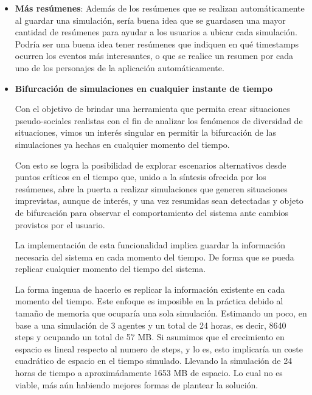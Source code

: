 \begin{itemize}
	\item \textbf{Más resúmenes}: Además de los resúmenes que se realizan automáticamente al guardar una simulación, sería buena idea que se guardasen una mayor cantidad de resúmenes para ayudar a los usuarios a ubicar cada simulación. Podría ser una buena idea tener resúmenes que indiquen en qué timestamps ocurren los eventos más interesantes, o que se realice un resumen por cada uno de los personajes de la aplicación automáticamente.

	\item\textbf{Bifurcación de simulaciones en cualquier instante de tiempo}

Con el objetivo de brindar una herramienta que permita crear situaciones pseudo-sociales realistas con el fin de analizar los fenómenos de diversidad de situaciones, vimos un interés singular en permitir la bifurcación de las simulaciones ya hechas en cualquier momento del tiempo.

Con esto se logra la posibilidad de explorar escenarios alternativos desde puntos críticos en el tiempo que, unido a la síntesis ofrecida por los resúmenes, abre la puerta a realizar simulaciones que generen situaciones imprevistas, aunque de interés, y una vez resumidas sean detectadas y objeto de bifurcación para observar el comportamiento del sistema ante cambios provistos por el usuario.

La implementación de esta funcionalidad implica guardar la información necesaria del sistema en cada momento del tiempo. De forma que se pueda replicar cualquier momento del tiempo del sistema. 

La forma ingenua de hacerlo es replicar la información existente en cada momento del tiempo. Este enfoque es imposible en la práctica debido al tamaño de memoria que ocuparía una sola simulación. Estimando un poco, en base a una simulación de 3 agentes y un total de 24 horas, es decir, 8640 steps y ocupando un total de 57 MB. Si asumimos que el crecimiento en espacio es lineal respecto al numero de steps, y lo es, esto implicaría un coste cuadrático de espacio en el tiempo simulado. Llevando la simulación de 24 horas de tiempo a aproximádamente 1653 MB de espacio. Lo cual no es viable, más aún habiendo mejores formas de plantear la solución.	

\end{itemize}

